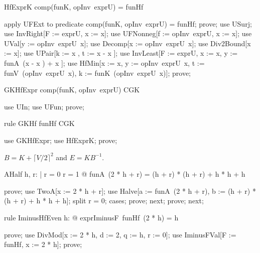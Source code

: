 \documentclass{article}
\begin{document}
\begin{theorem}{HfExprK}
  comp(funK, opInv~exprU) = funHf
\end{theorem}

\begin{zproof}
apply UFExt to predicate comp(funK, opInv~exprU) = funHf;
prove;
use USurj;
use InvRight[F := exprU, x := x];
use UFNonneg[f := opInv~exprU, x := x];
use UVal[y := opInv~exprU~x];
use Decomp[x := opInv~exprU~x];
use Div2Bound[x := x];
use UPair[k := x , t := x - x ];
use InvLeast[F := exprU, x := x, y := funA~(x - x ) + x ];
use HfMin[x := x, y := opInv~exprU~x, t := funV~(opInv~exprU~x), k := funK~(opInv~exprU~x)];
prove;
\end{zproof}

\begin{theorem}{GKHfExpr}
  comp(funK, opInv~exprU) \in CGK
\end{theorem}

\begin{zproof}
use UIn;
use UFun;
prove;
\end{zproof}

\begin{theorem}{rule GKHf}
  funHf \in CGK
\end{theorem}

\begin{zproof}
use GKHfExpr;
use HfExprK;
prove;
\end{zproof}

$B = K + \lceil V/2 \rceil^2$ and $E = K B^{-1}$.

\begin{theorem}{AHalf}
  \forall h, r: \nat | r = 0 \lor r = 1 @ funA~(2 * h + r) = (h + r) * (h + r) + h * h + h
\end{theorem}

\begin{zproof}
prove;
use TwoA[x := 2 * h + r];
use Halve[a := funA~(2 * h + r), b := (h + r) * (h + r) + h * h + h];
split r = 0;
cases;
prove;
next;
prove;
next;
\end{zproof}

\begin{theorem}{rule IminusHfEven}
  \forall h: \nat @ exprIminusF~funHf~(2 * h) = h
\end{theorem}

\begin{zproof}
prove;
use DivMod[x := 2 * h, d := 2, q := h, r := 0];
use IminusFVal[F := funHf, x := 2 * h];
prove;
\end{zproof}
\end{document}

